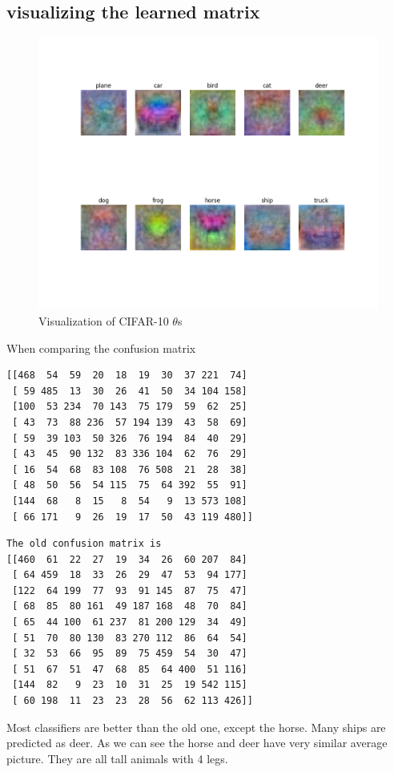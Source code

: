 \documentclass[pdftex,11pt]{article}
\begin{document}
\subsection{visualizing the learned  matrix}
\begin{figure}
  \caption{Visualization of CIFAR-10 $\theta$s}
  \centering
   \includegraphics[scale=0.5]{classifernew.png}
\end{figure}
When comparing the confusion matrix
\begin{lstlisting} 
[[468  54  59  20  18  19  30  37 221  74]
 [ 59 485  13  30  26  41  50  34 104 158]
 [100  53 234  70 143  75 179  59  62  25]
 [ 43  73  88 236  57 194 139  43  58  69]
 [ 59  39 103  50 326  76 194  84  40  29]
 [ 43  45  90 132  83 336 104  62  76  29]
 [ 16  54  68  83 108  76 508  21  28  38]
 [ 48  50  56  54 115  75  64 392  55  91]
 [144  68   8  15   8  54   9  13 573 108]
 [ 66 171   9  26  19  17  50  43 119 480]]
\end{lstlisting} 


\begin{lstlisting}    
The old confusion matrix is 
[[460  61  22  27  19  34  26  60 207  84]
 [ 64 459  18  33  26  29  47  53  94 177]
 [122  64 199  77  93  91 145  87  75  47]
 [ 68  85  80 161  49 187 168  48  70  84]
 [ 65  44 100  61 237  81 200 129  34  49]
 [ 51  70  80 130  83 270 112  86  64  54]
 [ 32  53  66  95  89  75 459  54  30  47]
 [ 51  67  51  47  68  85  64 400  51 116]
 [144  82   9  23  10  31  25  19 542 115]
 [ 60 198  11  23  23  28  56  62 113 426]]
\end{lstlisting}    
Most classifiers are better than the old one, except the horse.
Many ships are predicted as deer. As we can see the horse and deer have very similar average picture. They are all tall animals with 4 legs.
\end{document}
